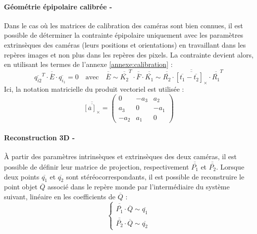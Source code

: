 \documentclass[a4paper, 11pt]{article}
\begin{document}
		\paragraph{Géométrie épipolaire calibrée -}
			Dans le cas où les matrices de calibration des caméras sont bien connues, il est possible de déterminer la contrainte épipolaire uniquement avec les paramètres extrinsèques des caméras (leurs positions et orientations) en travaillant dans les repères images et non plus dans les repères des pixels. La contrainte devient alors, en utilisant les termes de l'annexe \ref{annexe:calibration} :
			\begin{equation}
				\overline{q_{i2}}^T \cdot \overline{\overline{E}} \cdot \overline{q_{i_1}} = 0
				\quad\text{avec}\quad
				\overline{\overline{E}} \sim \overline{\overline{K_2}}^T \cdot \overline{\overline{F}} \cdot \overline{\overline{K_1}} \sim
				\overline{\overline{R_2}} \cdot \overline{\overline{[\overline{t_1} - \overline{t_2}]_\times}} \cdot \overline{\overline{R_1}}^T
			\end{equation}
			Ici, la notation matricielle du produit vectoriel est utilisée :
			\begin{equation}
				\overline{\overline{[\overline{a}]_\times}} = \begin{pmatrix}
					0 & -a_3 & a_2\\a_3 & 0 & -a_1\\-a_2 & a_1 & 0
				\end{pmatrix}
			\end{equation}
		\paragraph{Reconstruction 3D -}
			\`A partir des paramètres intrinsèques et extrinsèques des deux caméras, il est possible de définir leur matrice de projection, respectivement $\overline{\overline{P_1}}$ et $\overline{\overline{P_2}}$. Lorsque deux points $\overline{q_1}$ et $\overline{q_2}$ sont stéréocorrespondants, il est possible de reconstruire le point objet $\overline{Q}$ associé dans le repère monde par l'intermédiaire du système suivant, linéaire en les coefficients de $\overline{Q}$ :
			\begin{equation}
				\left\{\begin{array}{l}
					\overline{\overline{P_1}} \cdot \overline{Q} \sim \overline{q_1} \\
				\overline{\overline{P_2}} \cdot \overline{Q} \sim \overline{q_2}
				\end{array}\right.
			\end{equation}
\end{document}
